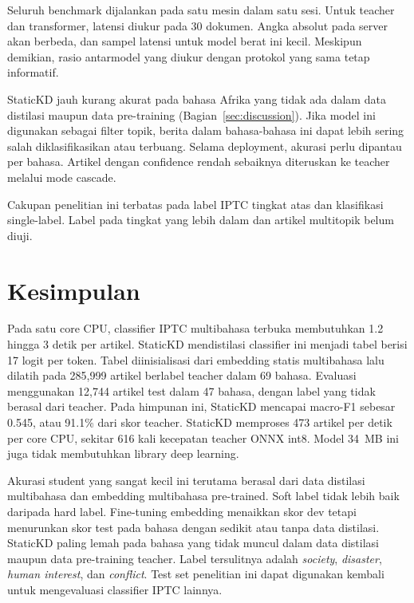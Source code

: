 \documentclass[journal]{IEEEtran}
\begin{document}
Seluruh benchmark dijalankan pada satu mesin dalam satu sesi. Untuk teacher dan transformer, latensi diukur pada 30 dokumen. Angka absolut pada server akan berbeda, dan sampel latensi untuk model berat ini kecil. Meskipun demikian, rasio antarmodel yang diukur dengan protokol yang sama tetap informatif.

StaticKD jauh kurang akurat pada bahasa Afrika yang tidak ada dalam data distilasi maupun data pre-training (Bagian~\ref{sec:discussion}). Jika model ini digunakan sebagai filter topik, berita dalam bahasa-bahasa ini dapat lebih sering salah diklasifikasikan atau terbuang. Selama deployment, akurasi perlu dipantau per bahasa. Artikel dengan confidence rendah sebaiknya diteruskan ke teacher melalui mode cascade.

Cakupan penelitian ini terbatas pada label IPTC tingkat atas dan klasifikasi single-label. Label pada tingkat yang lebih dalam dan artikel multitopik belum diuji.

\section{Kesimpulan}
\label{sec:conclusion}
Pada satu core CPU, classifier IPTC multibahasa terbuka membutuhkan 1.2 hingga 3 detik per artikel. StaticKD mendistilasi classifier ini menjadi tabel berisi 17 logit per token. Tabel diinisialisasi dari embedding statis multibahasa lalu dilatih pada 285,999 artikel berlabel teacher dalam 69 bahasa. Evaluasi menggunakan 12,744 artikel test dalam 47 bahasa, dengan label yang tidak berasal dari teacher. Pada himpunan ini, StaticKD mencapai macro-F1 sebesar 0.545, atau 91.1\% dari skor teacher. StaticKD memproses 473 artikel per detik per core CPU, sekitar 616 kali kecepatan teacher ONNX int8. Model 34~MB ini juga tidak membutuhkan library deep learning.

Akurasi student yang sangat kecil ini terutama berasal dari data distilasi multibahasa dan embedding multibahasa pre-trained. Soft label tidak lebih baik daripada hard label. Fine-tuning embedding menaikkan skor dev tetapi menurunkan skor test pada bahasa dengan sedikit atau tanpa data distilasi. StaticKD paling lemah pada bahasa yang tidak muncul dalam data distilasi maupun data pre-training teacher. Label tersulitnya adalah \emph{society}, \emph{disaster}, \emph{human interest}, dan \emph{conflict}. Test set penelitian ini dapat digunakan kembali untuk mengevaluasi classifier IPTC lainnya.
\end{document}
